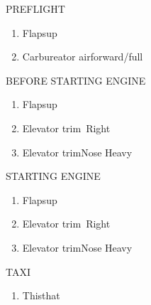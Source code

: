 \documentclass[11pt,letterpaper,twocolumn]{article}
\newcommand*{\doctitle}[1]{\centering{\Huge\sf#1}} %
\newcommand*{\protitle}[1]{{\Large\sf#1}} %
\newcommand*{\proitem}[2]{\item#1\dotfill#2} %
\newenvironment*{prolist}[1] %
	{\begin{center}
	\protitle{#1}
	\begin{enumerate}[noitemsep]}
	{\end{enumerate}
	\end{center}}
\begin{document}



	\begin{prolist}{PREFLIGHT}
		\proitem{Flaps}{up}
		\proitem{Carbureator air}{forward/full}
	\end{prolist}

	\begin{prolist}{BEFORE STARTING ENGINE}
		\proitem{Flaps}{up}
		\proitem{Elevator trim}{5\textdegree\ Right}
		\proitem{Elevator trim}{Nose Heavy}
	\end{prolist}

	\begin{prolist}{STARTING ENGINE}
		\proitem{Flaps}{up}
		\proitem{Elevator trim}{5\textdegree\ Right}
		\proitem{Elevator trim}{Nose Heavy}
	\end{prolist}


	\begin{prolist}{TAXI}
		\proitem{This}{that}
	\end{prolist}

\end{document}
